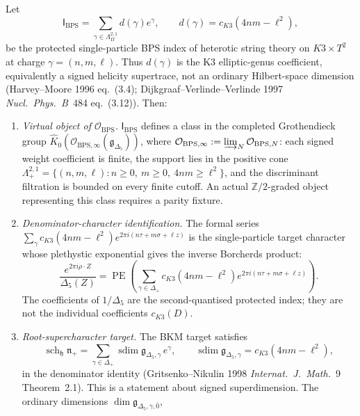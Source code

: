 \begin{theorem}
\label{thm:k3ca-harvey-moore-bps-hilbert}
Let
\[
 \mathsf I_{\mathrm{BPS}}
 =
 \sum_{\gamma\in\Lambda^{2,1}_{II}}
 d(\gamma)e^\gamma,
 \qquad
 d(\gamma)=c_{K3}(4nm-\ell^2),
\]
be the protected single-particle BPS index of heterotic string theory
on $K3\times T^2$ at charge $\gamma=(n,m,\ell)$. Thus
$d(\gamma)$ is the K3 elliptic-genus coefficient, equivalently a
signed helicity supertrace, not an ordinary Hilbert-space dimension
(Harvey--Moore 1996 eq.\ (3.4);
Dijkgraaf--Verlinde--Verlinde 1997
\emph{Nucl.\ Phys.\ B}~484 eq.\ (3.12)). Then:
\begin{enumerate}[label=\textup{(\roman*)}]
\item \emph{Virtual object of $\mathcal{O}_{\mathrm{BPS}}$.}
 $\mathsf I_{\mathrm{BPS}}$ defines a class in the completed
 Grothendieck group
 $\widehat{K}_0(\mathcal{O}_{\mathrm{BPS},\infty}(\mathfrak g_{\Delta_5}))$,
 where
 $\mathcal{O}_{\mathrm{BPS},\infty}:=\varinjlim_N
 \mathcal{O}_{\mathrm{BPS},N}$: each signed weight coefficient is
 finite, the support lies in the positive cone
 $\Lambda_+^{2,1}=\{(n,m,\ell): n\geq 0,\ m\geq 0,\ 4nm\geq\ell^2\}$,
 and the discriminant filtration is bounded on every finite cutoff.
 An actual $\mathbb Z/2$-graded object representing this class
 requires a parity fixture.
\item \emph{Denominator-character identification.}
 The formal series
 $\sum_\gamma c_{K3}(4nm-\ell^2)
 e^{2\pi i(n\tau + m\sigma + \ell z)}$
 is the single-particle target character whose plethystic exponential
 gives the inverse Borcherds product:
 \[
  \frac{e^{2\pi i\rho\cdot Z}}{\Delta_5(Z)}
  =
  \operatorname{PE}\!\left(
  \sum_{\gamma\in\Delta_+}
  c_{K3}(4nm-\ell^2)
  e^{2\pi i(n\tau + m\sigma + \ell z)}
  \right).
 \]
 The coefficients of $1/\Delta_5$ are the second-quantised protected
 index; they are not the individual coefficients $c_{K3}(D)$.
\item \emph{Root-supercharacter target.} The BKM target satisfies
 \[
  \operatorname{sch}_{\mathfrak h}\mathfrak n_+
  =
  \sum_{\gamma\in\Delta_+}
  \operatorname{sdim}\mathfrak g_{\Delta_5,\gamma}\,e^\gamma,
  \qquad
  \operatorname{sdim}\mathfrak g_{\Delta_5,\gamma}
  =
  c_{K3}(4nm-\ell^2),
 \]
 in the denominator identity (Gritsenko--Nikulin 1998
 \emph{Internat.\ J.\ Math.}~9 Theorem~2.1). This is a statement about
 signed superdimension. The ordinary dimensions
 $\dim\mathfrak g_{\Delta_5,\gamma,\bar0}$,

\end{enumerate}
\end{theorem}
